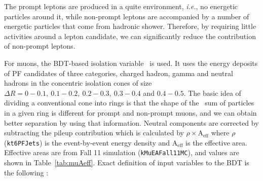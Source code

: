 The prompt leptons are produced in a quite environment, \textit{i.e.}, 
no energetic particles around it, while non-prompt leptons are accompanied 
by a number of energetic particles that come from hadronic shower.
Therefore, by requiring little activities around a lepton candidate, 
we can significantly reduce the contribution of non-prompt leptons. 

For muons, the BDT-based isolation variable~\cite{MuonRingIso} is used.
It uses the energy deposits of PF candidates of three categories, 
charged hadron, gamma and neutral hadrons in the concentric isolation cones
of size $\Delta R = 0-0.1,~0.1-0.2,~0.2-0.3,~0.3-0.4$ and $0.4-0.5$.
The basic idea of dividing a conventional cone into rings 
is that the shape of the \pt\ sum of particles in a given 
ring is different for prompt and non-prompt muons, and we can 
obtain better separation by using that information.   
Neutral components are corrected by subtracting the pileup contribution which is 
calculated by $\rho \times \textrm{A}_{\textrm{eff}}$ where 
$\rho$ (\texttt{kt6PFJets}) is the 
event-by-event energy density and $\textrm{A}_{\textrm{eff}}$ is the effective area.  
Effective areas are from Fall 11 simulation (\texttt{kMuEAFall11MC}), and 
values are shown in Table~\ref{tab:muAeff}.  
Exact definition of input variables to the BDT is the following :
